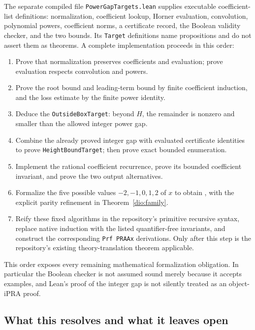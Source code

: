 The separate compiled file \texttt{PowerGapTargets.lean} supplies
executable coefficient-list definitions: normalization, coefficient
lookup, Horner evaluation, convolution, polynomial powers, coefficient
norms, a certificate record, the Boolean validity checker, and the two
bounds.  Its \texttt{Target} definitions name propositions and do not
assert them as theorems.  A complete implementation proceeds in this
order:
\begin{enumerate}
 \item Prove that normalization preserves coefficients and evaluation;
       prove evaluation respects convolution and powers.
 \item Prove the root bound and leading-term bound by finite coefficient
       induction, and the loss estimate by the finite power identity.
 \item Deduce the \texttt{OutsideBoxTarget}: beyond $H$, the remainder is
       nonzero and smaller than the allowed integer power gap.
 \item Combine the already proved integer gap with evaluated certificate
       identities to prove \texttt{HeightBoundTarget}; then prove exact
       bounded enumeration.
 \item Implement the rational coefficient recurrence, prove its bounded
       coefficient invariant, and prove the two output alternatives.
 \item Formalize the five possible values $-2,-1,0,1,2$ of $x$ to obtain
       , with the explicit parity
       refinement in Theorem~\ref{dio:family}.
 \item Reify these fixed algorithms in the repository's primitive
       recursive syntax, replace native induction with the listed
       quantifier-free invariants, and construct the corresponding
       \texttt{Prf PRAAx} derivations.  Only after this step is the
       repository's existing theory-translation theorem applicable.
\end{enumerate}

This order exposes every remaining mathematical formalization obligation.
In particular the Boolean checker is not assumed sound merely because
it accepts examples, and Lean's proof of the integer gap is not silently
treated as an object-iPRA proof.

\subsection{What this resolves and what it leaves open}

